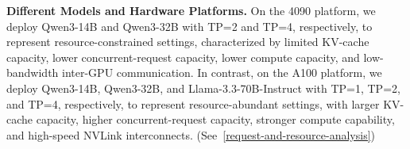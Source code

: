 
\textbf{Different Models and Hardware Platforms.}
On the 4090 platform, we deploy Qwen3-14B and Qwen3-32B with TP=2 and TP=4, respectively, to represent resource-constrained settings, characterized by limited KV-cache capacity, lower concurrent-request capacity, lower compute capacity, and low-bandwidth inter-GPU communication.
In contrast, on the A100 platform, we deploy Qwen3-14B, Qwen3-32B, and Llama-3.3-70B-Instruct with TP=1, TP=2, and TP=4, respectively, to represent resource-abundant settings, with larger KV-cache capacity, higher concurrent-request capacity, stronger compute capability, and high-speed NVLink interconnects. (See~\autoref{request-and-resource-analysis})

